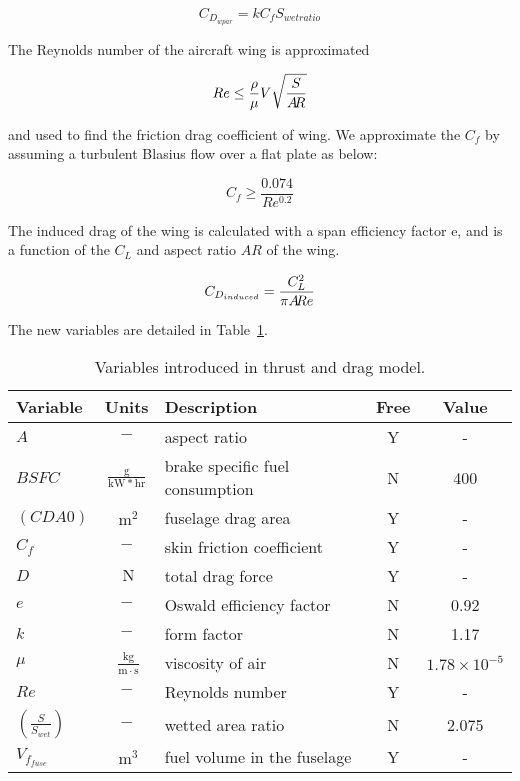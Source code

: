 \begin{equation}
    C_{D_{wpar}} = k C_f S_{wetratio}
\label{e:cdwpar}
\end{equation}

The Reynolds number of the aircraft wing is approximated

\begin{equation}
    Re \leq \frac{\rho}{\mu} V \sqrt{\frac{S}{A\hspace{-2.0pt}R}}
\label{e:re}
\end{equation}

and used to find the friction drag coefficient of wing. We approximate the $C_f$ by assuming a
turbulent Blasius flow over a flat plate as below:

\begin{equation}
    C_f \geq \frac{0.074} {Re^{0.2}}
\end{equation}

The induced drag of the wing is calculated with a span efficiency factor e, and is a
function of the $C_L$ and aspect ratio $AR$ of the wing.

\begin{equation}
    C_{D_{induced}} = \frac{C_L^2}{\pi A\hspace{-2.0pt}R e}
\label{e:cdinduced}
\end{equation}

The new variables are detailed in Table~\ref{t:vars_TandD}.

\begin{footnotesize}
\begin{table}
    \centering
    \begin{tabular}{ l c l c c }
        \toprule
        Variable & Units & Description & Free & Value \\
        \midrule
        $A$ & $-$ & aspect ratio & Y & - \\
        $BSFC$ & $\mathrm{\frac{g}{kW*hr}}$ & brake specific fuel consumption & N & 400 \\
        $(CDA0)$ & $~\mathrm{m^{2}}$ & fuselage drag area & Y & - \\
        $C_f$ & $-$ & skin friction coefficient & Y & - \\
        $D$ & $~\mathrm{N}$ & total drag force & Y & - \\
        $e$ & $-$ & Oswald efficiency factor & N & 0.92 \\
        $k$ & $-$ & form factor & N & 1.17 \\
        $\mu$ & $~\mathrm{\tfrac{kg}{m\cdot s}}$ & viscosity of air & N &
            $\mathrm{1.78 \times 10^{-5}}$ \\
        $Re$ & $-$ & Reynolds number & Y & - \\
        $(\frac{S}{S_{wet}})$ & $-$ & wetted area ratio & N & 2.075 \\
        $V_{f_{fuse}}$ & $~\mathrm{m^{3}}$ & fuel volume in the fuselage & Y & - \\
        \bottomrule
    \end{tabular}
    \caption{Variables introduced in thrust and drag model.}
    \label{t:vars_TandD}
\end{table} \end{footnotesize}

